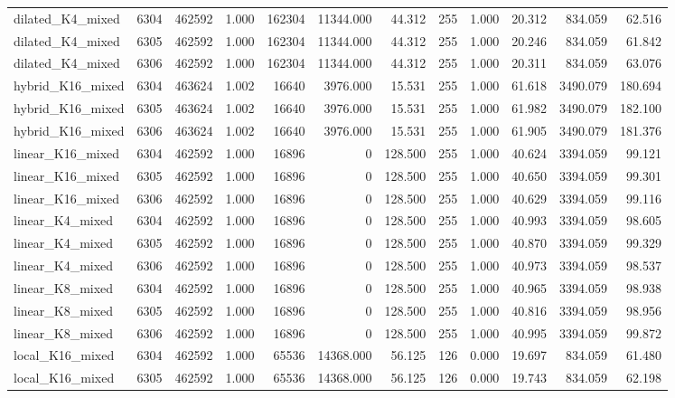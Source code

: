 \begin{tabular}{lrrrrrrrrrrr}
dilated\_K4\_mixed & 6304 & 462592 & 1.000 & 162304 & 11344.000 & 44.312 & 255 & 1.000 & 20.312 & 834.059 & 62.516 \\
dilated\_K4\_mixed & 6305 & 462592 & 1.000 & 162304 & 11344.000 & 44.312 & 255 & 1.000 & 20.246 & 834.059 & 61.842 \\
dilated\_K4\_mixed & 6306 & 462592 & 1.000 & 162304 & 11344.000 & 44.312 & 255 & 1.000 & 20.311 & 834.059 & 63.076 \\
hybrid\_K16\_mixed & 6304 & 463624 & 1.002 & 16640 & 3976.000 & 15.531 & 255 & 1.000 & 61.618 & 3490.079 & 180.694 \\
hybrid\_K16\_mixed & 6305 & 463624 & 1.002 & 16640 & 3976.000 & 15.531 & 255 & 1.000 & 61.982 & 3490.079 & 182.100 \\
hybrid\_K16\_mixed & 6306 & 463624 & 1.002 & 16640 & 3976.000 & 15.531 & 255 & 1.000 & 61.905 & 3490.079 & 181.376 \\
linear\_K16\_mixed & 6304 & 462592 & 1.000 & 16896 & 0 & 128.500 & 255 & 1.000 & 40.624 & 3394.059 & 99.121 \\
linear\_K16\_mixed & 6305 & 462592 & 1.000 & 16896 & 0 & 128.500 & 255 & 1.000 & 40.650 & 3394.059 & 99.301 \\
linear\_K16\_mixed & 6306 & 462592 & 1.000 & 16896 & 0 & 128.500 & 255 & 1.000 & 40.629 & 3394.059 & 99.116 \\
linear\_K4\_mixed & 6304 & 462592 & 1.000 & 16896 & 0 & 128.500 & 255 & 1.000 & 40.993 & 3394.059 & 98.605 \\
linear\_K4\_mixed & 6305 & 462592 & 1.000 & 16896 & 0 & 128.500 & 255 & 1.000 & 40.870 & 3394.059 & 99.329 \\
linear\_K4\_mixed & 6306 & 462592 & 1.000 & 16896 & 0 & 128.500 & 255 & 1.000 & 40.973 & 3394.059 & 98.537 \\
linear\_K8\_mixed & 6304 & 462592 & 1.000 & 16896 & 0 & 128.500 & 255 & 1.000 & 40.965 & 3394.059 & 98.938 \\
linear\_K8\_mixed & 6305 & 462592 & 1.000 & 16896 & 0 & 128.500 & 255 & 1.000 & 40.816 & 3394.059 & 98.956 \\
linear\_K8\_mixed & 6306 & 462592 & 1.000 & 16896 & 0 & 128.500 & 255 & 1.000 & 40.995 & 3394.059 & 99.872 \\
local\_K16\_mixed & 6304 & 462592 & 1.000 & 65536 & 14368.000 & 56.125 & 126 & 0.000 & 19.697 & 834.059 & 61.480 \\
local\_K16\_mixed & 6305 & 462592 & 1.000 & 65536 & 14368.000 & 56.125 & 126 & 0.000 & 19.743 & 834.059 & 62.198 \\

\end{tabular}
